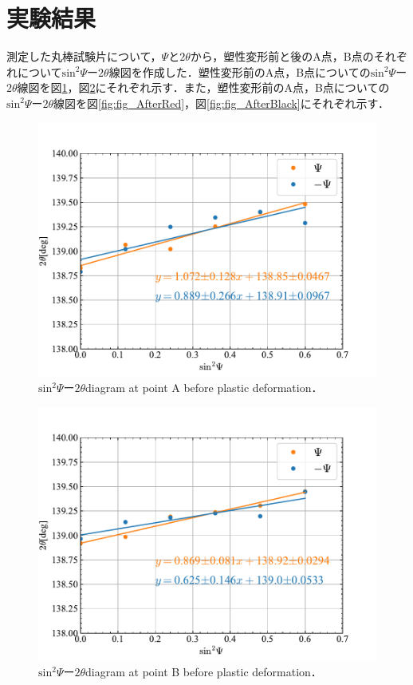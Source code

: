 \section{実験結果}

測定した丸棒試験片について，$\Psi$と$2\theta$から，塑性変形前と後のA点，B点のそれぞれについて$\mathrm{sin}^2\Psi$ー$2\theta$線図を作成した．塑性変形前のA点，B点についての$\mathrm{sin}^2\Psi$ー$2\theta$線図を図\ref{fig:fig_BeforeRed}，図\ref{fig:fig_BeforeBlack}にそれぞれ示す．また，塑性変形前のA点，B点についての$\mathrm{sin}^2\Psi$ー$2\theta$線図を図\ref{fig:fig_AfterRed}，図\ref{fig:fig_AfterBlack}にそれぞれ示す．
\begin{figure}[htbp]
    \centering %
    \includegraphics[width=100truemm,clip]{fig/fig_BeforeRed.pdf}
    \caption{$\mathrm{sin}^2\Psi$ー$2\theta$diagram at point A before plastic deformation．}
    \label{fig:fig_BeforeRed}
\end{figure}
\begin{figure}[htbp]
    \centering %
    \includegraphics[width=100truemm,clip]{fig/fig_BeforeBlack.pdf}
    \caption{$\mathrm{sin}^2\Psi$ー$2\theta$diagram at point B before plastic deformation．}
    \label{fig:fig_BeforeBlack}
\end{figure}

